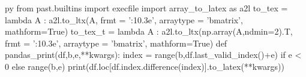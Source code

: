 \usepackage{subfiles}


\usepackage[textwidth=4cm]{todonotes}

\usepackage{minted}



\usepackage{pythontex}
\begin{pythontexcustomcode}{py}
from past.builtins import execfile
import array_to_latex as a2l
to_tex = lambda A : a2l.to_ltx(A, frmt = '{:10.3e}', arraytype = 'bmatrix', mathform=True)
to_tex_t = lambda A : a2l.to_ltx(np.array(A,ndmin=2).T, frmt = '{:10.3e}', arraytype = 'bmatrix', mathform=True)
def pandas_print(df,b,e,**kwargs):
	index = range(b,df.last_valid_index()+e) if e < 0 else range(b,e)
	print(df.loc[df.index.difference(index)].to_latex(**kwargs))
\end{pythontexcustomcode}


